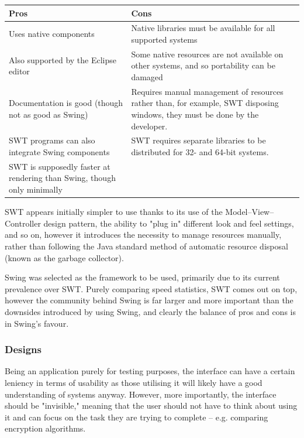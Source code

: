       \begin{center}
       \begin{tabular}{ | p{6cm} | p{6cm} |}
          \hline
          Pros & Cons \\ \hline \hline
          Uses native components & Native libraries must be available for all supported systems \\ \hline
          Also supported by the Eclipse editor & Some native resources are not available on other systems, and so portability can be damaged \\ \hline
          Documentation is good (though not as good as Swing) & Requires manual management of resources rather than, for example, SWT disposing windows, they must be done by the developer. \\ \hline
          SWT programs can also integrate Swing components & SWT requires separate libraries to be distributed for 32- and 64-bit systems. \\ \hline
          SWT is supposedly faster at rendering than Swing, though only minimally & \\
          \hline
        \end{tabular}
      \end{center}
      
      SWT appears initially simpler to use thanks to its use of the Model--View--Controller design pattern, the ability to "plug in" different look and feel settings, and so on, however it introduces the necessity to manage resources manually, rather than following the Java standard method of automatic resource disposal (known as the garbage collector).
      
      Swing was selected as the framework to be used, primarily due to its current prevalence over SWT. Purely comparing speed statistics, SWT comes out on top, however the community behind Swing is far larger and more important than the downsides introduced by using Swing, and clearly the balance of pros and cons is in Swing's favour.
      
    \subsubsection{Designs}
    
    Being an application purely for testing purposes, the interface can have a certain leniency in terms of usability as those utilising it will likely have a good understanding of systems anyway. However, more importantly, the interface should be "invisible," meaning that the user should not have to think about using it and can focus on the task they are trying to complete -- e.g. comparing encryption algorithms.
    

